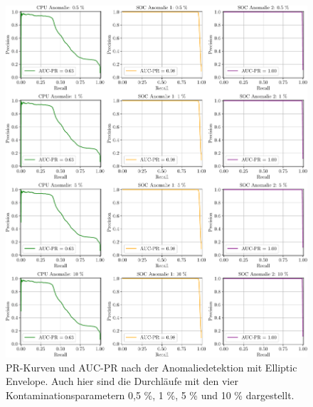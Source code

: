 \begin{figure}[t!]
    \centering
        \includegraphics[width=1\linewidth]{ch5_anomalieerkennung/abbildungen/EE_PR_AUC_PR.pdf}
    \caption{\centering PR-Kurven und AUC-PR nach der Anomaliedetektion mit Elliptic Envelope. Auch hier sind die Durchläufe mit den vier
    Kontaminationsparametern 0,5 \%, 1 \%, 5 \% und 10 \% dargestellt.}
    \label{fig:EE_AUC_PR}
\end{figure}

